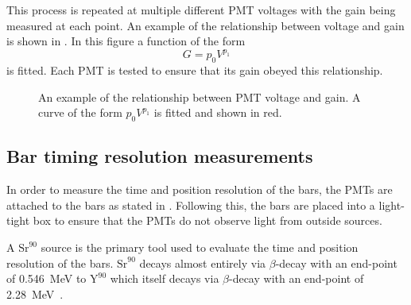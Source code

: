 This process is repeated at multiple different PMT voltages with the gain being measured at each point.
An example of the relationship between voltage and gain is shown in .
In this figure a function of the form
\begin{equation}
  G = p_{0} V^{p_{1}}
\end{equation}
is fitted.
Each PMT is tested to ensure that its gain obeyed this relationship.

\begin{figure}[h]
  \centering
  \begin{adjustbox}{max totalsize={\textwidth}, center}
    
  \end{adjustbox}
  \caption[Example of relationship between PMT voltage and gain]{An example of the relationship between PMT voltage and gain. A curve of the form $p_{0} V^{p_{1}}$ is fitted and shown in red.}
  \label{fig:gainEx}
\end{figure}

\subsection{Bar timing resolution measurements}
\label{ch:hptpc_dtof_characterisation:characterisation:barRes}

In order to measure the time and position resolution of the bars, the PMTs are attached to the bars as stated in .
Following this, the bars are placed into a light-tight box to ensure that the PMTs do not observe light from outside sources.

A $\text{Sr}^{90}$ source is the primary tool used to evaluate the time and position resolution of the bars.
$\text{Sr}^{90}$ decays almost entirely via $\beta$-decay with an end-point of \SI{0.546}{\mega\electronvolt} to $\text{Y}^{90}$ which itself decays via $\beta$-decay with an end-point of \SI{2.28}{\mega\electronvolt}~\cite{strontium}.
